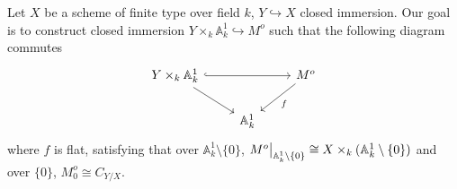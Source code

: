 \documentclass{ctexart}
\begin{document}
Let $X$ be a scheme of finite type over field $k$, $Y \hookrightarrow X$ closed immersion.
Our goal is to construct closed immersion $Y \times_{k} \mathbb{A}_{k}^{1} \hookrightarrow M^{o}$ such that the following diagram commutes
\begin{equation*}
    \begin{tikzcd}
        Y \times_{k} \mathbb{A}_{k}^{1} \arrow[rr, hookrightarrow] \arrow[dr] &&
        M^{o} \arrow[dl, "f"] \\
        & \mathbb{A}_{k}^{1} &
    \end{tikzcd}
\end{equation*}
where $f$ is flat,
satisfying that over $\mathbb{A}_{k}^{1} \setminus \{0\}$, $M^{o}\big{|}_{\mathbb{A}_{k}^{1} \setminus \{0\}} \cong X \times_{k} (\mathbb{A}_{k}^{1} \setminus \{0\})$ and over $\{0\}$, $M_{0}^{o} \cong C_{Y/X}$.
\end{document}
